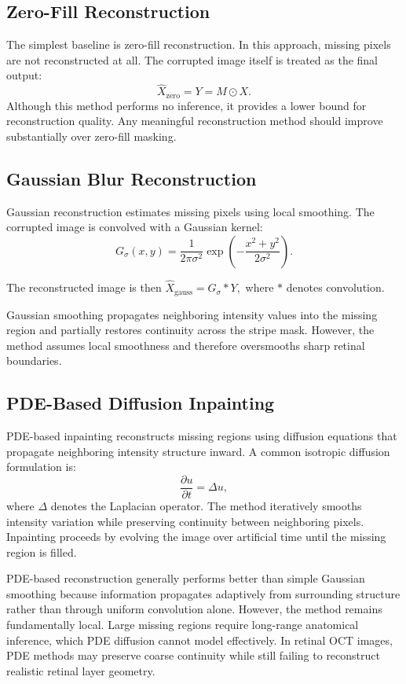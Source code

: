 \documentclass[12pt,oneside]{article}
\begin{document}
\subsection{Zero-Fill Reconstruction}

The simplest baseline is zero-fill reconstruction. In this approach, missing pixels are not reconstructed at all. The corrupted image itself is treated as the final output:
\[
\hat{X}_{\mathrm{zero}}
=
Y
=
M \odot X.
\]
Although this method performs no inference, it provides a lower bound for reconstruction quality. Any meaningful reconstruction method should improve substantially over zero-fill masking.

\subsection{Gaussian Blur Reconstruction}

Gaussian reconstruction estimates missing pixels using local smoothing. The corrupted image is convolved with a Gaussian kernel:
\[
G_\sigma(x,y)
=
\frac{1}{2\pi\sigma^2}
\exp
\left(
-\frac{x^2+y^2}{2\sigma^2}
\right).
\]

The reconstructed image is then
\(
\hat{X}_{\mathrm{gauss}}
=
G_\sigma * Y,
\)
where $*$ denotes convolution.

Gaussian smoothing propagates neighboring intensity values into the missing region and partially restores continuity across the stripe mask. However, the method assumes local smoothness and therefore oversmooths sharp retinal boundaries.

\subsection{PDE-Based Diffusion Inpainting}

PDE-based inpainting reconstructs missing regions using diffusion equations that propagate neighboring intensity structure inward.
A common isotropic diffusion formulation is:
\[
\frac{\partial u}{\partial t}
=
\Delta u,
\]
where $\Delta$ denotes the Laplacian operator.
The method iteratively smooths intensity variation while preserving continuity between neighboring pixels. Inpainting proceeds by evolving the image over artificial time until the missing region is filled.

PDE-based reconstruction generally performs better than simple Gaussian smoothing because information propagates adaptively from surrounding structure rather than through uniform convolution alone.
However, the method remains fundamentally local. Large missing regions require long-range anatomical inference, which PDE diffusion cannot model effectively. In retinal OCT images, PDE methods may preserve coarse continuity while still failing to reconstruct realistic retinal layer geometry.
\end{document}
